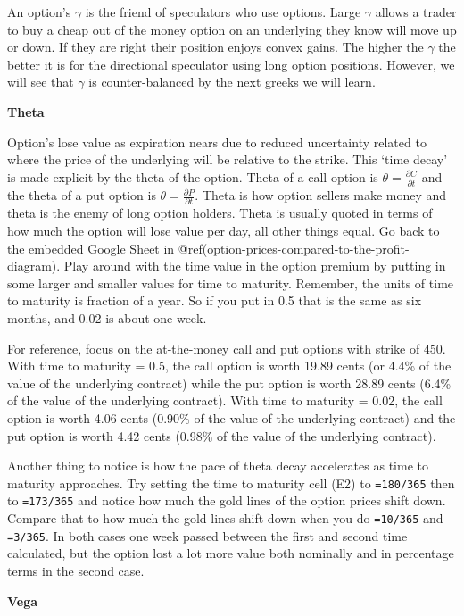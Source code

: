 \documentclass[
  letterpaper,
  DIV=11,
  numbers=noendperiod]{scrreprt}
\begin{document}
An option's \(\gamma\) is the friend of speculators who use options.
Large \(\gamma\) allows a trader to buy a cheap out of the money option
on an underlying they know will move up or down. If they are right their
position enjoys convex gains. The higher the \(\gamma\) the better it is
for the directional speculator using long option positions. However, we
will see that \(\gamma\) is counter-balanced by the next greeks we will
learn.

\textbf{Theta}

Option's lose value as expiration nears due to reduced uncertainty
related to where the price of the underlying will be relative to the
strike. This `time decay' is made explicit by the theta of the option.
Theta of a call option is \(\theta = \frac{\partial C}{\partial t}\) and
the theta of a put option is \(\theta = \frac{\partial P}{\partial t}\).
Theta is how option sellers make money and theta is the enemy of long
option holders. Theta is usually quoted in terms of how much the option
will lose value per day, all other things equal. Go back to the embedded
Google Sheet in @ref(option-prices-compared-to-the-profit-diagram). Play
around with the time value in the option premium by putting in some
larger and smaller values for time to maturity. Remember, the units of
time to maturity is fraction of a year. So if you put in 0.5 that is the
same as six months, and 0.02 is about one week.

For reference, focus on the at-the-money call and put options with
strike of 450. With time to maturity = 0.5, the call option is worth
19.89 cents (or 4.4\% of the value of the underlying contract) while the
put option is worth 28.89 cents (6.4\% of the value of the underlying
contract). With time to maturity = 0.02, the call option is worth 4.06
cents (0.90\% of the value of the underlying contract) and the put
option is worth 4.42 cents (0.98\% of the value of the underlying
contract).

Another thing to notice is how the pace of theta decay accelerates as
time to maturity approaches. Try setting the time to maturity cell (E2)
to \texttt{=180/365} then to \texttt{=173/365} and notice how much the
gold lines of the option prices shift down. Compare that to how much the
gold lines shift down when you do \texttt{=10/365} and \texttt{=3/365}.
In both cases one week passed between the first and second time
calculated, but the option lost a lot more value both nominally and in
percentage terms in the second case.

\textbf{Vega}
\end{document}
